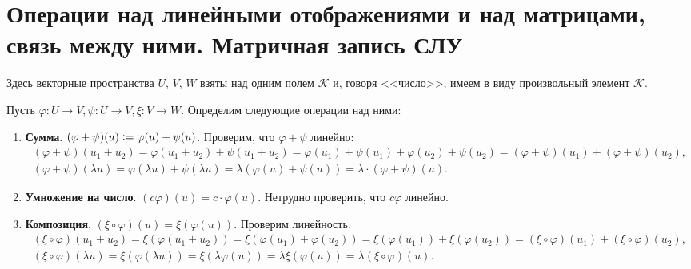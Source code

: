 \section{Операции над линейными отображениями и над матрицами, связь между ними. Матричная запись СЛУ}

\begin{remark}
    Здесь векторные пространства $U$, $V$, $W$ взяты над одним полем $\mathcal{K}$ и, говоря <<число>>, имеем в виду произвольный элемент $\mathcal{K}$.
\end{remark}

\begin{definition}
    Пусть $\varphi: U \rightarrow V, \psi: U \rightarrow V, \xi: V \rightarrow W$. Определим следующие операции над ними:
    \begin{enumerate}[nolistsep]
        \item \textbf{Сумма}. $(\varphi + \psi)(u) \vcentcolon = \varphi(u) + \psi(u)$. Проверим, что $\varphi + \psi$ линейно:
            $$
            \begin{array}{c}
                (\varphi + \psi)(u_1 + u_2) = \varphi(u_1 + u_2) + \psi(u_1 + u_2) = \varphi(u_1) + \psi(u_1) + \varphi(u_2) + \psi(u_2) = (\varphi + \psi)(u_1) + (\varphi + \psi)(u_2),\\
                (\varphi + \psi)(\lambda u) = \varphi(\lambda u) + \psi(\lambda u) = \lambda(\varphi(u) + \psi(u)) = \lambda \cdot (\varphi + \psi)(u).
            \end{array}
            $$
        \item \textbf{Умножение на число}. $(c\varphi)(u) = c \cdot \varphi(u)$. Нетрудно проверить, что $c\varphi$ линейно.
        \item \textbf{Композиция}. $(\xi \circ \varphi)(u) = \xi(\varphi(u))$. Проверим линейность:
            $$
            \begin{array}{c}
                (\xi \circ \varphi)(u_1 + u_2) = \xi(\varphi(u_1 + u_2)) = \xi(\varphi(u_1) + \varphi(u_2)) = \xi(\varphi(u_1)) + \xi(\varphi(u_2)) = (\xi \circ \varphi)(u_1) + (\xi \circ \varphi)(u_2),\\
                (\xi \circ \varphi)(\lambda u) = \xi(\varphi(\lambda u)) = \xi(\lambda\varphi(u)) = \lambda\xi(\varphi(u)) = \lambda(\xi \circ \varphi)(u).
            \end{array}
            $$
    \end{enumerate}
\end{definition}

